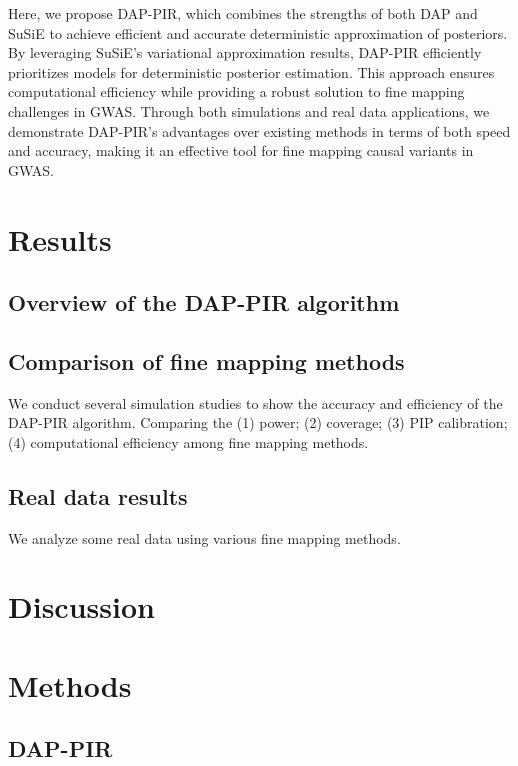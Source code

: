 \documentclass[pdflatex,sn-mathphys-num]{sn-jnl}%
\theoremstyle{thmstyleone}%
\theoremstyle{thmstyletwo}%
\theoremstyle{thmstylethree}%
\begin{document}
Here, we propose DAP-PIR, which combines the strengths of both DAP and SuSiE to achieve efficient and accurate deterministic approximation of posteriors. By leveraging SuSiE's variational approximation results, DAP-PIR efficiently prioritizes models for deterministic posterior estimation. This approach ensures computational efficiency while providing a robust solution to fine mapping challenges in GWAS. Through both simulations and real data applications, we demonstrate DAP-PIR’s advantages over existing methods in terms of both speed and accuracy, making it an effective tool for fine mapping causal variants in GWAS.



\section{Results}\label{sec2}
\subsection{Overview of the DAP-PIR algorithm}\label{subsec1}

\subsection{Comparison of fine mapping methods}\label{subsec3}
We conduct several simulation studies to show the accuracy and efficiency of the DAP-PIR algorithm. Comparing the (1) power; (2) coverage; (3) PIP calibration; (4) computational efficiency among fine mapping methods.

\subsection{Real data results}\label{subsec4}
We analyze some real data using various fine mapping methods.

\section{Discussion}\label{sec3}



\section{Methods}\label{sec4}
\subsection{DAP-PIR}\label{subsec1}
\end{document}

